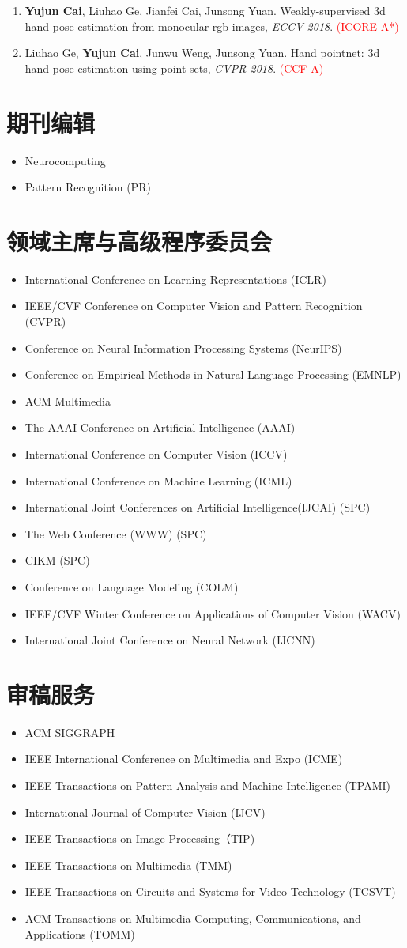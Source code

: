 \documentclass[UTF8,a4paper,11pt,fontset=fandol]{ctexart}
\newcommand{\rSection}[1]{\section*{#1}}
\begin{document}
\begin{enumerate}
\item \textbf{Yujun Cai}, Liuhao Ge, Jianfei Cai, Junsong Yuan. Weakly-supervised 3d hand pose estimation from monocular rgb images, \textit{ECCV 2018}. \textcolor{red}{(ICORE A*)}

\item Liuhao Ge, \textbf{Yujun Cai}, Junwu Weng, Junsong Yuan. Hand pointnet: 3d hand pose estimation using point sets, \textit{CVPR 2018}. \textcolor{red}{(CCF-A)}
\end{enumerate}

\rSection{期刊编辑}
\begin{itemize}
\item Neurocomputing
\item Pattern Recognition (PR)
\end{itemize}
\rSection{领域主席与高级程序委员会}
\begin{itemize}
\item International Conference on Learning Representations (ICLR)
\item IEEE/CVF Conference on Computer Vision and Pattern Recognition (CVPR)
\item Conference on Neural Information Processing Systems (NeurIPS)
\item Conference on Empirical Methods in Natural Language Processing (EMNLP)
\item ACM Multimedia
\item The AAAI Conference on Artificial Intelligence (AAAI)
\item International Conference on Computer Vision (ICCV)
\item International Conference on Machine Learning (ICML)
\item International Joint Conferences on Artificial Intelligence(IJCAI)   (SPC)
\item The Web Conference (WWW)  (SPC)
\item CIKM (SPC)
\item Conference on Language Modeling (COLM)
\item IEEE/CVF Winter Conference on Applications of Computer Vision (WACV)
\item International Joint Conference on Neural Network (IJCNN)
\end{itemize}
\rSection{审稿服务}
\begin{itemize}
\item ACM SIGGRAPH
\item IEEE International Conference on Multimedia and Expo (ICME)
\item IEEE Transactions on Pattern Analysis and Machine Intelligence (TPAMI)
\item International Journal of Computer Vision (IJCV)
\item IEEE Transactions on Image Processing（TIP)
\item IEEE Transactions on Multimedia (TMM)
\item IEEE Transactions on Circuits and Systems for Video Technology (TCSVT)
\item ACM Transactions on Multimedia Computing, Communications, and Applications (TOMM)
\end{itemize}
\end{document}
